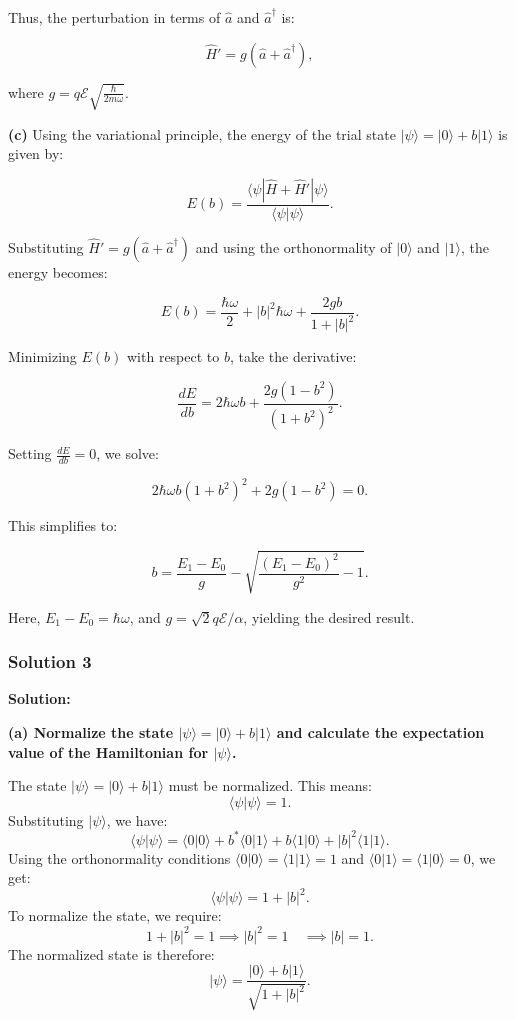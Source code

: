 \documentclass{article}
\begin{document}
Thus, the perturbation in terms of \(\hat{a}\) and \(\hat{a}^\dagger\) is:

\[
\hat{H}' = g (\hat{a} + \hat{a}^\dagger),
\]

where \(g = q \mathcal{E} \sqrt{\frac{\hbar}{2m\omega}}\).

\textbf{(c)} Using the variational principle, the energy of the trial state \(|\psi\rangle = |0\rangle + b|1\rangle\) is given by:

\[
E(b) = \frac{\langle \psi | \hat{H} + \hat{H}' | \psi \rangle}{\langle \psi | \psi \rangle}.
\]

Substituting \(\hat{H}' = g (\hat{a} + \hat{a}^\dagger)\) and using the orthonormality of \(|0\rangle\) and \(|1\rangle\), the energy becomes:

\[
E(b) = \frac{\hbar \omega}{2} + |b|^2 \hbar \omega + \frac{2 g b}{1 + |b|^2}.
\]

Minimizing \(E(b)\) with respect to \(b\), take the derivative:

\[
\frac{dE}{db} = 2 \hbar \omega b + \frac{2g(1 - b^2)}{(1 + b^2)^2}.
\]

Setting \(\frac{dE}{db} = 0\), we solve:

\[
2 \hbar \omega b (1 + b^2)^2 + 2g(1 - b^2) = 0.
\]

This simplifies to:

\[
b = \frac{E_1 - E_0}{g} - \sqrt{\frac{(E_1 - E_0)^2}{g^2} - 1}.
\]

Here, \(E_1 - E_0 = \hbar \omega\), and \(g = \sqrt{2} q \mathcal{E}/\alpha\), yielding the desired result.

\subsubsection{Solution 3}

\textbf{Solution:}

\textbf{(a) Normalize the state \(|\psi\rangle = |0\rangle + b |1\rangle\) and calculate the expectation value of the Hamiltonian for \(|\psi\rangle\).}

The state \(|\psi\rangle = |0\rangle + b |1\rangle\) must be normalized. This means:
\[
\langle \psi | \psi \rangle = 1.
\]
Substituting \(|\psi\rangle\), we have:
\[
\langle \psi | \psi \rangle = \langle 0 | 0 \rangle + b^* \langle 0 | 1 \rangle + b \langle 1 | 0 \rangle + |b|^2 \langle 1 | 1 \rangle.
\]
Using the orthonormality conditions \(\langle 0 | 0 \rangle = \langle 1 | 1 \rangle = 1\) and \(\langle 0 | 1 \rangle = \langle 1 | 0 \rangle = 0\), we get:
\[
\langle \psi | \psi \rangle = 1 + |b|^2.
\]
To normalize the state, we require:
\[
1 + |b|^2 = 1 \implies |b|^2 = 1 \quad \implies |b| = 1.
\]
The normalized state is therefore:
\[
|\psi\rangle = \frac{|0\rangle + b |1\rangle}{\sqrt{1 + |b|^2}}.
\]
\end{document}
